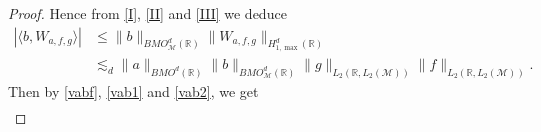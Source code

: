 \documentclass[oneside,english,a4wide]{amsart}
\numberwithin{equation}{section}
\numberwithin{figure}{section}
\theoremstyle{plain}
\theoremstyle{plain}
\theoremstyle{definition}
\theoremstyle{plain}
\theoremstyle{remark}
\theoremstyle{definition}
\theoremstyle{remark}
\theoremstyle{definition}
\newcommand{\8}{\infty}
\begin{document}
\begin{proof}
	Hence from \eqref{I}, \eqref{II} and \eqref{III} we deduce
	\begin{equation}\label{vab2}
		\begin{aligned}
			|\langle b, W_{a,f,g}\rangle|{}&\le \|b\|_{BMO^d_{\mathcal{M}}(\mathbb{R})}\|W_{a,f,g}\|_{H_{1,\max}^d(\mathbb{R})}\\
			&\lesssim_d \|a\|_{BMO^d(\mathbb{R})}\|b\|_{BMO^d_{\mathcal{M}}(\mathbb{R})}\|g\|_{L_2(\mathbb{R},L_2(\mathcal{M}))}\|f\|_{L_2(\mathbb{R},L_2(\mathcal{M}))}.
		\end{aligned}
	\end{equation}
	Then by \eqref{vabf}, \eqref{vab1} and \eqref{vab2}, we get
	\begin{equation*}
		\begin{aligned}

\end{aligned}
\end{equation*}
\end{proof}
\end{document}

